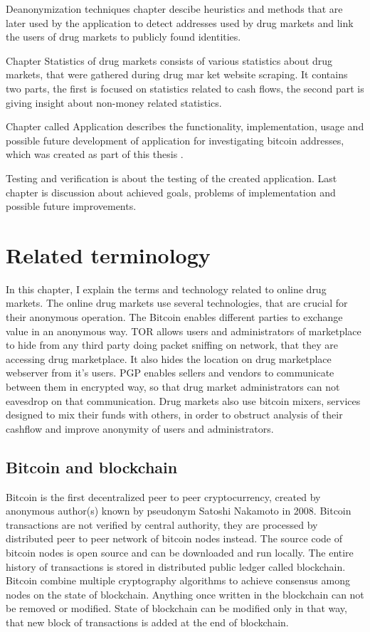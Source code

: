 \documentclass[
  digital, %
  table,   %
  lof,     %
  lot,     %
  oneside
]{fithesis3}
\begin{document}
Deanonymization techniques chapter descibe heuristics and methods that are later used by the application to detect 
addresses used by drug markets and link the users of drug markets to publicly found identities.

Chapter Statistics of drug markets consists of various statistics about drug markets, that were gathered during drug mar
ket website scraping.
It contains two parts, the first is focused on statistics related to cash flows, the second part is giving insight about
 non-money related statistics.

Chapter called Application describes the functionality, implementation, usage and 
possible future development of application for investigating bitcoin addresses, which was created as part of this thesis
.

Testing and verification is about the testing of the created application.
Last chapter is discussion about achieved goals, problems of implementation and possible future improvements.

\chapter{Related terminology}

In this chapter, I explain the terms and technology related to online drug markets.
The online drug markets use several technologies, that are crucial for their anonymous operation.
The Bitcoin enables different parties to exchange value in an anonymous way.
TOR allows users and administrators of marketplace to hide from any third party doing packet sniffing on network,
that they are accessing drug marketplace. It also hides the location on drug marketplace webserver from it's users.
PGP enables sellers and vendors to communicate between them in encrypted way,
so that drug market administrators can not eavesdrop on that communication.
Drug markets also use bitcoin mixers, services designed to mix their funds with others, in order to obstruct
analysis of their cashflow and improve anonymity of users and administrators.

\section{Bitcoin and blockchain}

Bitcoin \parencite{nakamoto2008bitcoin} is the first decentralized peer to peer cryptocurrency,
created by anonymous author(s) known by pseudonym Satoshi Nakamoto in 2008.
Bitcoin transactions are not verified by central authority, they are  
processed by distributed peer to peer network of bitcoin nodes instead. 
The source code of bitcoin nodes is open source and can be downloaded and run locally. 
The entire history of transactions is stored in distributed public ledger called blockchain.
Bitcoin combine multiple cryptography algorithms to achieve consensus among nodes
on the state of blockchain. Anything once written in the blockchain
can not be removed or modified. State of blockchain can be modified only in that way, that new
block of transactions is added at the end of blockchain.
\end{document}
